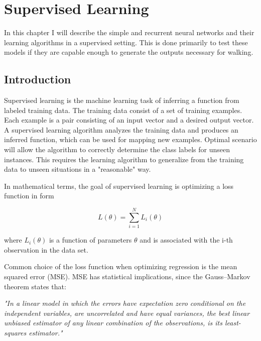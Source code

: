 \makeatletter
\newcommand\footnoteref[1]{\protected@xdef\@thefnmark{\ref{#1}}\@footnotemark}
\makeatother


\chapter{Supervised Learning}
\label{chapter:sl}

In this chapter I will describe the simple and recurrent neural networks and their learning algorithms in a supervised setting. This is done primarily to test these models if they are capable enough to generate the outputs necessary for walking.

\section{Introduction}

Supervised learning is the machine learning task of inferring a function from labeled training data. The training data consist of a set of training examples. Each example is a pair consisting of an input vector and a desired output vector. A supervised learning algorithm analyzes the training data and produces an inferred function, which can be used for mapping new examples. Optimal scenario will allow the algorithm to correctly determine the class labels for unseen instances. This requires the learning algorithm to generalize from the training data to unseen situations in a "reasonable" way.\cite{cite:wiki-sl}

In mathematical terms, the goal of supervised learning is optimizing a loss function in form

\begin{equation}
L(\theta)=\sum_{i=1}^{N}L_i(\theta)
\end{equation}

where $L_i(\theta)$ is a function of parameters $\theta$ and is associated with the i-th observation in the data set.

\medskip

Common choice of the loss function when optimizing regression is the mean squared error (MSE). MSE has statistical implications, since the Gauss–Markov theorem states that:

 \textit{"In a linear model in which the errors have expectation zero conditional on the independent variables, are uncorrelated and have equal variances, the best linear unbiased estimator of any linear combination of the observations, is its least-squares estimator."} \cite{cite:wiki-mse}

